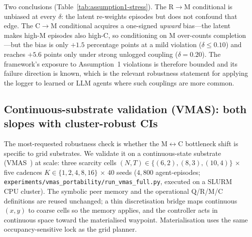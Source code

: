 \documentclass{article}
\newcommand{\method}[1]{\texttt{#1}}
\begin{document}
Two conclusions (Table~\ref{tab:assumption1-stress}). The R$\to$M conditional is unbiased at every $\delta$: the latent re-weights episodes but does not confound that edge. The C$\to$M conditional acquires a one-signed \emph{upward} bias---the latent makes high-M episodes also high-C, so conditioning on M over-counts completion---but the bias is only $+1.5$ percentage points at a mild violation ($\delta\!\le\!0.10$) and reaches $+5.6$ points only under strong unlogged coupling ($\delta{=}0.20$). The framework's exposure to Assumption~1 violations is therefore bounded and its failure direction is known, which is the relevant robustness statement for applying the logger to learned or LLM agents where such couplings are more common.

\subsection{Continuous-substrate validation (VMAS): both slopes with cluster-robust CIs}
\label{app:vmas}

The most-requested robustness check is whether the M$\leftrightarrow$C
bottleneck shift is specific to grid substrates. We validate it on a
continuous-state substrate (VMAS~\citep{bettini2022vmas}) at scale: three
scarcity cells $(N,T)\in\{(6,2),(8,3),(10,4)\}$ $\times$ five cadences
$K\in\{1,2,4,8,16\}$ $\times$ $40$ seeds ($4{,}800$ agent-episodes;
\method{experiments/vmas\_portability/run\_vmas\_full.py}, executed on a SLURM
CPU cluster). The symbolic peer memory and the operational Q/R/M/C definitions
are reused unchanged; a thin discretisation bridge maps continuous $(x,y)$ to
coarse cells so the memory applies, and the controller acts in continuous space
toward the materialised waypoint. Materialisation uses the same
occupancy-sensitive lock as the grid planner.
\end{document}
